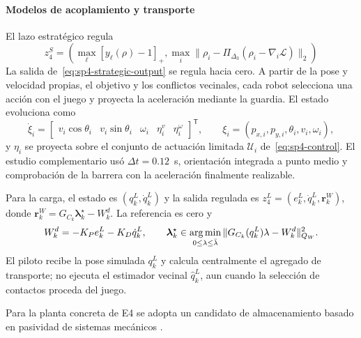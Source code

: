 \paragraph{Modelos de acoplamiento y transporte}

El lazo estratégico regula
\begin{equation}
\label{eq:sp4-strategic-output}
z_4^S=\left(\max_\ell[y_\ell(\rho)-1]_+,
\max_i\|\rho_i-\Pi_{\Delta_3}(\rho_i-\nabla_i\mathcal L)\|_2\right)
\end{equation}
La salida de~\eqref{eq:sp4-strategic-output} se regula hacia cero. A partir de la pose y velocidad propias, el objetivo y los conflictos vecinales, cada robot selecciona una acción con el juego y proyecta la aceleración mediante la guardia. El estado evoluciona como
\begin{equation}
 \dot\xi_i=
 \begin{bmatrix}
 v_i\cos\theta_i & v_i\sin\theta_i & \omega_i & \eta_i^v & \eta_i^\omega
 \end{bmatrix}^{\mathsf T},
 \qquad \xi_i=(p_{x,i},p_{y,i},\theta_i,v_i,\omega_i),
 \label{eq:sp4-dynamic-unicycle}
\end{equation}
y $\eta_i$ se proyecta sobre el conjunto de actuación limitada $\mathcal U_i$ de~\eqref{eq:sp4-control}. El estudio complementario usó $\Delta t=0.12$~s, orientación integrada a punto medio y comprobación de la barrera con la aceleración finalmente realizable.

Para la carga, el estado es $(q_k^L,\dot q_k^L)$ y la salida regulada es
$z_4^L=(e_k^L,\dot q_k^L,\boldsymbol r_k^W)$, donde
$\boldsymbol r_k^W=G_{C_k}\boldsymbol\lambda_k^\star-W_k^d$. La referencia es cero y
\begin{equation}
\label{eq:sp4-pose-law}
W_k^d=-K_Pe_k^L-K_D\dot q_k^L,\qquad
\boldsymbol\lambda_k^\star\in\operatorname*{arg\,min}_{0\leq\lambda\leq\bar\lambda}
\|G_{C_k}(q_k^L)\lambda-W_k^d\|_{Q_W}^2.
\end{equation}
El piloto recibe la pose simulada $q_k^L$ y calcula centralmente el agregado de transporte; no ejecuta el estimador vecinal $\hat q_k^L$, aun cuando la selección de contactos proceda del juego.

Para la planta concreta de E4 se adopta un candidato de almacenamiento basado en pasividad de sistemas mecánicos \parencite{vanderschaf2017passivity,ortega2002passivity}.


